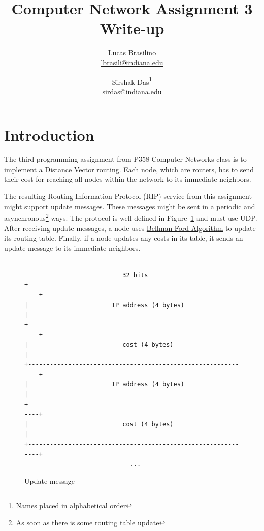 \documentclass[10pt]{extarticle}
\title{Computer Network Assignment 3 Write-up}
\author{Lucas Brasilino \\ 
  \href{mailto:lbrasili@indiana.edu}{lbrasili@indiana.edu}
  \and Sirshak Das\footnote{Names placed in alphabetical order} \\  
  \href{mailto:sirdas@indiana.edu}{sirdas@indiana.edu}
}
\date{}
\begin{document}
                                 
\thispagestyle{empty}
\maketitle

\section{Introduction}

The third programming assignment from P358 Computer Networks class is to
implement a Distance Vector routing. Each node, which are routers, has to send
their cost for reaching all nodes within the network to its immediate
neighbors. 

The resulting  Routing Information Protocol  (RIP) service from  this assignment
might support  update messages. These messages  might be sent in  a periodic and
asynchronous\footnote{As soon as  there is some routing table  update} ways. The
protocol is  well defined in  Figure~\ref{fig:protocol} and must use  UDP. After
receiving         update          messages,         a          node         uses
\href{https://en.wikipedia.org/wiki/Bellman%E2%80%93Ford_algorithm}{Bellman-Ford
Algorithm} to update its routing table. Finally,  if a node updates any costs in
its table, it sends an update message to its immediate neighbors.

\begin{figure}[!h]
\centering
\begin{BVerbatim}

                           32 bits
+--------------------------------------------------------------+
|                       IP address (4 bytes)                   |
+--------------------------------------------------------------+
|                          cost (4 bytes)                      |
+--------------------------------------------------------------+ 
|                       IP address (4 bytes)                   |
+--------------------------------------------------------------+
|                          cost (4 bytes)                      |
+--------------------------------------------------------------+
                             ...
\end{BVerbatim}
\caption{Update message}
\label{fig:protocol}
\end{figure}
\end{document}
